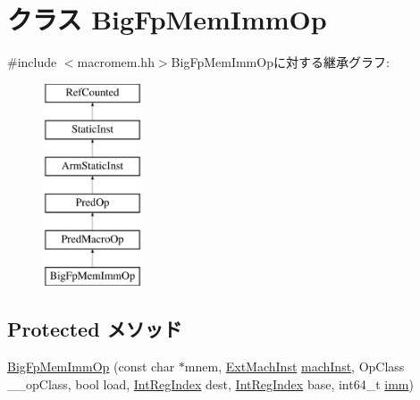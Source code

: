 \hypertarget{classArmISA_1_1BigFpMemImmOp}{
\section{クラス BigFpMemImmOp}
\label{classArmISA_1_1BigFpMemImmOp}
}


{\ttfamily \#include $<$macromem.hh$>$}BigFpMemImmOpに対する継承グラフ:\begin{figure}[H]
\begin{center}
\leavevmode
\includegraphics[height=6cm]{classArmISA_1_1BigFpMemImmOp}
\end{center}
\end{figure}
\subsection*{Protected メソッド}
\begin{DoxyCompactItemize}
\item 
\hyperlink{classArmISA_1_1BigFpMemImmOp_a6599205315e3ab3d08dcc63f0d41897a}{BigFpMemImmOp} (const char $\ast$mnem, \hyperlink{classStaticInst_a5605d4fc727eae9e595325c90c0ec108}{ExtMachInst} \hyperlink{classStaticInst_a744598b194ca3d4201d9414ce4cc4af4}{machInst}, OpClass \_\-\_\-opClass, bool load, \hyperlink{namespaceArmISA_ae64680ba9fb526106829d6bf92fc791b}{IntRegIndex} dest, \hyperlink{namespaceArmISA_ae64680ba9fb526106829d6bf92fc791b}{IntRegIndex} base, int64\_\-t \hyperlink{namespaceArmISA_a2308526fcc9af84548a72f9ba3102ec1}{imm})
\end{DoxyCompactItemize}


